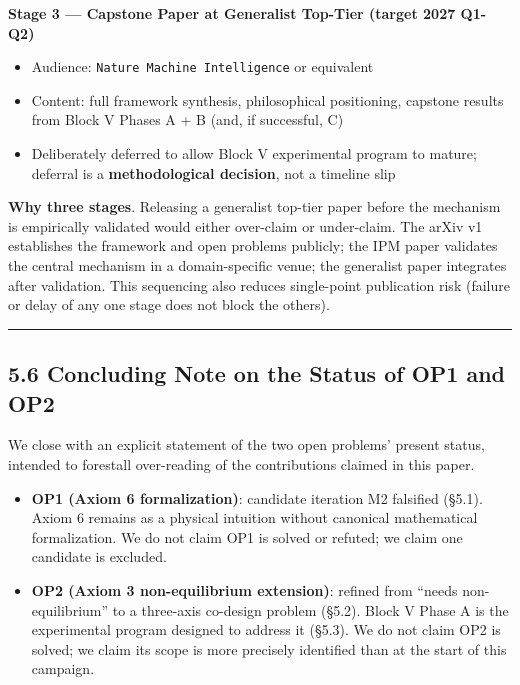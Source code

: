 \documentclass[
]{article}
\providecommand{\tightlist}{%
  \setlength{\itemsep}{0pt}\setlength{\parskip}{0pt}}
\begin{document}
\textbf{Stage 3 --- Capstone Paper at Generalist Top-Tier (target 2027
Q1-Q2)}

\begin{itemize}
\tightlist
\item
  Audience: \texttt{Nature\ Machine\ Intelligence} or equivalent
\item
  Content: full framework synthesis, philosophical positioning, capstone
  results from Block V Phases A + B (and, if successful, C)
\item
  Deliberately deferred to allow Block V experimental program to mature;
  deferral is a \textbf{methodological decision}, not a timeline slip
\end{itemize}

\textbf{Why three stages}. Releasing a generalist top-tier paper before
the mechanism is empirically validated would either over-claim or
under-claim. The arXiv v1 establishes the framework and open problems
publicly; the IPM paper validates the central mechanism in a
domain-specific venue; the generalist paper integrates after validation.
This sequencing also reduces single-point publication risk (failure or
delay of any one stage does not block the others).

\begin{center}\rule{0.5\linewidth}{0.5pt}\end{center}

\hypertarget{concluding-note-on-the-status-of-op1-and-op2}{%
\subsection{5.6 Concluding Note on the Status of OP1 and
OP2}\label{concluding-note-on-the-status-of-op1-and-op2}}

We close with an explicit statement of the two open problems' present
status, intended to forestall over-reading of the contributions claimed
in this paper.

\begin{itemize}
\tightlist
\item
  \textbf{OP1 (Axiom 6 formalization)}: candidate iteration M2 falsified
  (§5.1). Axiom 6 remains as a physical intuition without canonical
  mathematical formalization. We do not claim OP1 is solved or refuted;
  we claim one candidate is excluded.
\item
  \textbf{OP2 (Axiom 3 non-equilibrium extension)}: refined from ``needs
  non-equilibrium'' to a three-axis co-design problem (§5.2). Block V
  Phase A is the experimental program designed to address it (§5.3). We
  do not claim OP2 is solved; we claim its scope is more precisely
  identified than at the start of this campaign.
\end{itemize}
\end{document}
